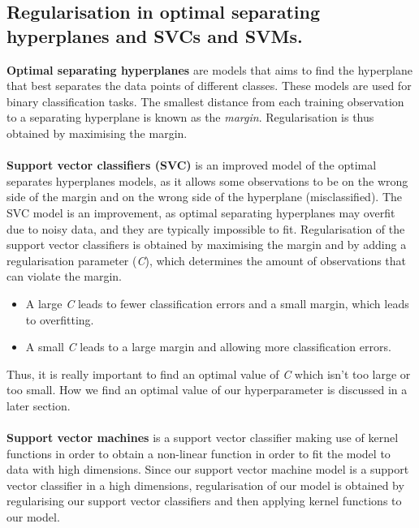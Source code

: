 \documentclass[12pt]{article}
\begin{document}
\subsection*{Regularisation in optimal separating hyperplanes and SVCs and SVMs.}
\textbf{Optimal separating hyperplanes} are models that aims to find the hyperplane that best separates the data points of different classes. These models are used for binary classification tasks.
The smallest distance from each training observation to a separating hyperplane is known as the \textit{margin}. 
Regularisation is thus obtained by maximising the margin. \\ \\
\textbf{Support vector classifiers (SVC)} is an improved model of the optimal separates hyperplanes models, as it allows some observations to be on the
wrong side of the margin and on the wrong side of the hyperplane (misclassified). The SVC model is an improvement, as optimal separating hyperplanes may overfit due to noisy data, and they are typically
impossible to fit. Regularisation of the support vector classifiers is obtained by maximising the margin and by adding a regularisation parameter (\textit{C}), which determines the amount of observations that can violate the margin.
\begin{itemize}
    \item A large \textit{C} leads to fewer classification errors and a small margin, which leads to overfitting.
    \item A small \textit{C} leads to a large margin and allowing more classification errors.
\end{itemize}
Thus, it is really important to find an optimal value of \textit{C} which isn't too large or too small.
How we find an optimal value of our hyperparameter is discussed in a later section.
\\ \\
\textbf{Support vector machines} is a support vector classifier making use of kernel functions in order to obtain a non-linear function in order to fit the model to data with high dimensions.
Since our support vector machine model is a support vector classifier in a high dimensions, regularisation of our model is obtained by regularising our support vector classifiers and then applying kernel functions to our model. 
\end{document}
